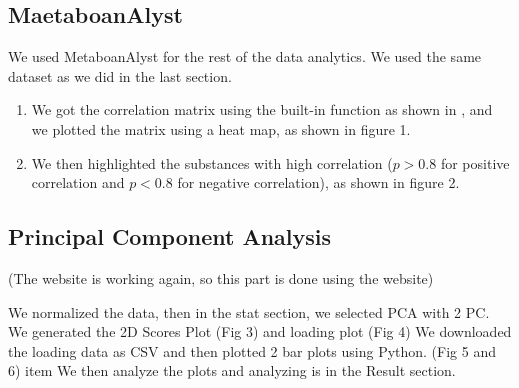 \documentclass{article}
\begin{document}
\subsection*{MaetaboanAlyst}
We used MetaboanAlyst for the rest of the data analytics.  We used the same dataset as we did in the last section. 


\begin{enumerate}
    We uploaded the CSV file to AetaboanAlyst with one var statistical analytics with the data type of concentration and sample of "rows (unpaired)." 
    We then skipped the missing value filling.
    We then normalized the data with "auto-scaling"
    In the statistical analysis model, we selected correlation. Then the website crashed. When I tried to reconnect, it said connection refused. It did go back for a while, but because of the unstableness, we moved on to using Python to do these analytics. 
     We load the data into the Pandas data frame, since correlation is independent then normalization, we don't need to normalize our data in this step.
     We replaced all missing values with 0s and removed all columns with only 0
    \item We got the correlation matrix using the built-in function as shown in \cite{pandaCo}, and we plotted the matrix using a heat map, as shown in figure 1.
    \item We then highlighted the substances with high correlation ($p>0.8$ for positive correlation and $p<0.8$ for negative correlation), as shown in figure 2.
    
\end{enumerate}

\subsection*{Principal Component Analysis}
(The website is working again, so this part is done using the website)
\begin{enumerate}
     We normalized the data, then in the stat section, we selected PCA with 2 PC.
     We generated the 2D Scores Plot (Fig 3) and loading plot (Fig 4)
     We downloaded the loading data as CSV and then plotted 2 bar plots using Python. (Fig 5 and 6)
   item We then analyze the plots and analyzing is in the Result section. 
\end{enumerate}
\end{document}

